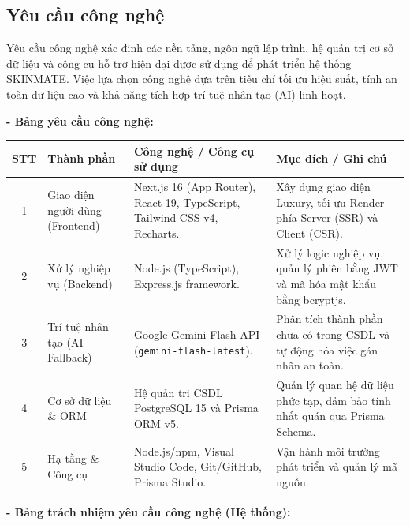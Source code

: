 \documentclass[12pt,a4paper]{article}
\begin{document}
\subsection{Yêu cầu công nghệ}
Yêu cầu công nghệ xác định các nền tảng, ngôn ngữ lập trình, hệ quản trị cơ sở dữ liệu và công cụ hỗ trợ hiện đại được sử dụng để phát triển hệ thống SKINMATE. Việc lựa chọn công nghệ dựa trên tiêu chí tối ưu hiệu suất, tính an toàn dữ liệu cao và khả năng tích hợp trí tuệ nhân tạo (AI) linh hoạt.

\textbf{- Bảng yêu cầu công nghệ:}

\begin{center}
\begin{tabular}{|c|p{3.5cm}|p{5.5cm}|p{3.5cm}|}
\hline
\textbf{STT} & \textbf{Thành phần} & \textbf{Công nghệ / Công cụ sử dụng} & \textbf{Mục đích / Ghi chú} \\
\hline
1 & Giao diện người dùng (Frontend) & Next.js 16 (App Router), React 19, TypeScript, Tailwind CSS v4, Recharts. & Xây dựng giao diện Luxury, tối ưu Render phía Server (SSR) và Client (CSR). \\
\hline
2 & Xử lý nghiệp vụ (Backend) & Node.js (TypeScript), Express.js framework. & Xử lý logic nghiệp vụ, quản lý phiên bằng JWT và mã hóa mật khẩu bằng bcryptjs. \\
\hline
3 & Trí tuệ nhân tạo (AI Fallback) & Google Gemini Flash API (\texttt{gemini-flash-latest}). & Phân tích thành phần chưa có trong CSDL và tự động hóa việc gán nhãn an toàn. \\
\hline
4 & Cơ sở dữ liệu \& ORM & Hệ quản trị CSDL PostgreSQL 15 và Prisma ORM v5. & Quản lý quan hệ dữ liệu phức tạp, đảm bảo tính nhất quán qua Prisma Schema. \\
\hline
5 & Hạ tầng \& Công cụ & Node.js/npm, Visual Studio Code, Git/GitHub, Prisma Studio. & Vận hành môi trường phát triển và quản lý mã nguồn. \\
\hline
\end{tabular}
\end{center}


\textbf{- Bảng trách nhiệm yêu cầu công nghệ (Hệ thống):}
\end{document}
